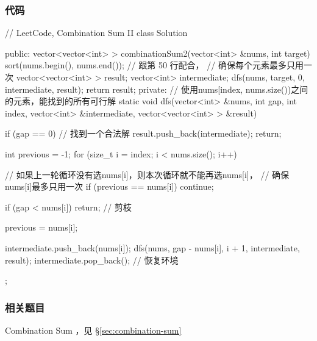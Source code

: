 \subsubsection{代码}
\begin{Code}
// LeetCode, Combination Sum II
class Solution {
public:
    vector<vector<int> > combinationSum2(vector<int> &nums, int target) {
        sort(nums.begin(), nums.end()); // 跟第 50 行配合，
                                             // 确保每个元素最多只用一次
        vector<vector<int> > result;
        vector<int> intermediate;
        dfs(nums, target, 0, intermediate, result);
        return result;
    }
private:
    // 使用nums[index, nums.size())之间的元素，能找到的所有可行解
    static void dfs(vector<int> &nums, int gap, int index,
            vector<int> &intermediate, vector<vector<int> > &result) {
        if (gap == 0) {  //  找到一个合法解
            result.push_back(intermediate);
            return;
        }

        int previous = -1;
        for (size_t i = index; i < nums.size(); i++) {
            // 如果上一轮循环没有选nums[i]，则本次循环就不能再选nums[i]，
            // 确保nums[i]最多只用一次
            if (previous == nums[i]) continue;

            if (gap < nums[i]) return;  // 剪枝

            previous = nums[i];

            intermediate.push_back(nums[i]);
            dfs(nums, gap - nums[i], i + 1, intermediate, result);
            intermediate.pop_back();  // 恢复环境
        }
    }
};
\end{Code}


\subsubsection{相关题目}
\begindot
\item Combination Sum ，见 \S \ref{sec:combination-sum}
\myenddot
